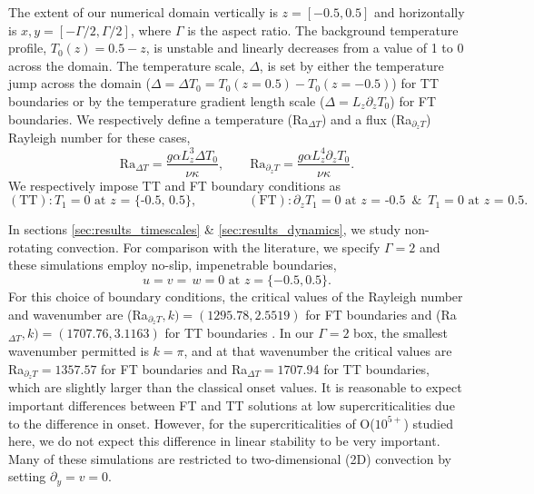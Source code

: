 \documentclass[aps, pre, onecolumn, nofootinbib, notitlepage, groupedaddress, amsfonts, amssymb, amsmath, longbibliography, superscriptaddress]{revtex4-1}
\begin{document}
The extent of our numerical domain vertically is $z = [-0.5, 0.5]$ and horizontally is $x, y = [-\Gamma/2, \Gamma/2]$, where $\Gamma$ is the aspect ratio.
The background temperature profile, $T_0(z) = 0.5 - z$, is unstable and linearly decreases from a value of 1 to 0 across the domain. 
The temperature scale, $\Delta$, is set by either the temperature jump across the domain ($\Delta = \Delta T_0 =  T_0(z=0.5)-T_0(z=-0.5)$) for TT boundaries or by the temperature gradient length scale ($\Delta = L_z \partial_z T_0$) for FT boundaries.
We respectively define a temperature (Ra$_{\Delta T}$) and a flux (Ra$_{\partial_z T}$) Rayleigh number for these cases,
\begin{equation}
\text{Ra}_{\Delta T} = \frac{g \alpha L_z^3 \Delta T_0}{\nu\kappa}, \qquad 
\text{Ra}_{\partial_z T} = \frac{g \alpha L_z^4 \partial_z T_0}{\nu\kappa}.
\end{equation}
We respectively impose TT and FT boundary conditions as
\begin{equation}
(\text{TT}): T_1 = 0 \text{ at $z$ = \{-0.5, 0.5\}},\qquad\qquad
(\text{FT}): \partial_z T_1 = 0 \text{ at $z$ = -0.5} \,\,\,\&\,\,\, T_1 = 0 \text{ at $z$ = 0.5}.
\end{equation}

In sections \ref{sec:results_timescales} \& \ref{sec:results_dynamics}, we study non-rotating convection.
For comparison with the literature, we specify $\Gamma = 2$ and these simulations employ no-slip, impenetrable boundaries,
\begin{equation}
u = v =\, w = 0 \, \, \text{at}\,\,z = \{-0.5, 0.5\}.
\label{eqn:vel_bcs}
\end{equation}
For this choice of boundary conditions, the critical values of the Rayleigh number and wavenumber are (Ra$_{\partial_z T}, k) = (1295.78, 2.5519)$ for FT boundaries and (Ra$_{\Delta T}, k) = (1707.76, 3.1163)$ for TT boundaries \cite{goluskin2016}.
In our $\Gamma = 2$ box, the smallest wavenumber permitted is $k = \pi$, and at that wavenumber the critical values are Ra$_{\partial_z T} = 1357.57$ for FT boundaries and Ra$_{\Delta T} = 1707.94$ for TT boundaries, which are slightly larger than the classical onset values.
It is reasonable to expect important differences between FT and TT solutions at low supercriticalities due to the difference in onset.
However, for the supercriticalities of O($10^{5+}$) studied here, we do not expect this difference in linear stability to be very important.
Many of these simulations are restricted to two-dimensional (2D) convection by setting $\partial_y = v = 0$.
\end{document}

